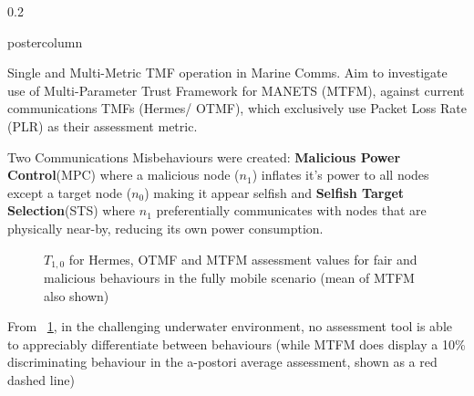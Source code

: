 \documentclass[final,hyperref={pdfpagelabels=false}]{beamer}
\def\colwidth{0.2\linewidth}
\begin{document}
\begin{frame}[fragile]
\begin{columns}[T]
\begin{column}{\colwidth}
\begin{beamercolorbox}[center,wd=\textwidth]{postercolumn}
\begin{minipage}[T]{.98\textwidth}
{\begin{block}{Single and Multi-Metric TMF operation in Marine Comms.}
							Aim to investigate use of Multi-Parameter Trust Framework for MANETS (MTFM), against current communications TMFs (Hermes/ OTMF), which exclusively use Packet Loss Rate (PLR) as their assessment metric.  
							
							\vspace{0.25\baselineskip}
														
							Two Communications Misbehaviours were created: \textbf{Malicious Power Control}(MPC) where a malicious node ($n_1$) inflates it's power to all nodes except a target node ($n_0$) making it appear selfish and \textbf{Selfish Target Selection}(STS) where $n_1$ preferentially communicates with nodes that are physically near-by, reducing its own power consumption.
							
							\begin{figure}[t]
								\caption{$T_{1,0}$ for Hermes, OTMF and MTFM assessment values for fair and malicious behaviours in the fully mobile scenario (mean of MTFM also shown)}
								\label{fig:otmf_beta_comparison}
							\end{figure}
							
							From ~\ref{fig:otmf_beta_comparison}, in the challenging underwater environment, no assessment tool is able to appreciably differentiate between behaviours (while MTFM does display a 10\% discriminating behaviour in the a-postori average assessment, shown as a red dashed line)
						\end{block}
						
}
\end{minipage}
\end{beamercolorbox}
\end{column}
\end{columns}
\end{frame}
\end{document}

